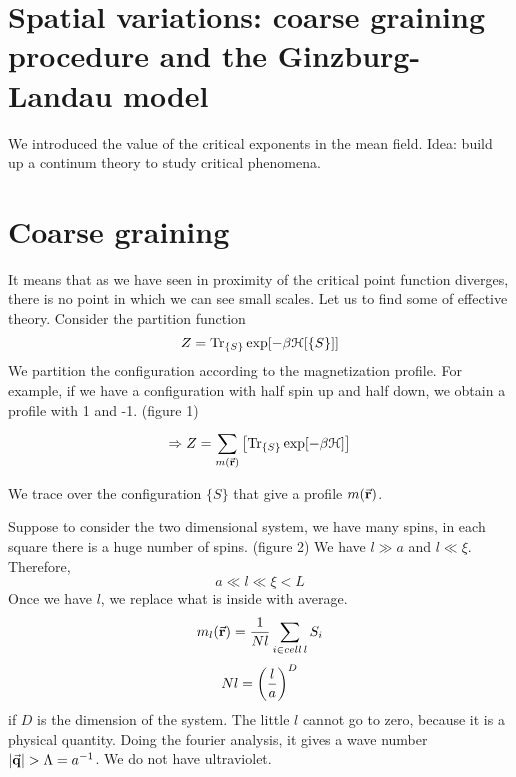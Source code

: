 \documentclass[../main/main.tex]{subfiles}
\begin{document}

\section{Spatial variations: coarse graining procedure and the Ginzburg-Landau model}



We introduced the value of the critical exponents in the mean field.
Idea: build up a continum theory to study critical phenomena.
\section{Coarse graining}
It means  that as we have seen in proximity of the critical point function diverges, there is no point in which we can see small scales. Let us to find some of effective theory.
Consider the partition function
\begin{equation}
  Z = \Tr_{\{ S \}  } \exp [- \beta \mathcal{H} [ \{ S \}  ]]
\end{equation}
We partition the configuration according to the magnetization profile. For example, if we have a configuration with half spin up and half down, we obtain a profile with 1 and -1. (figure 1)
\begin{equation}
\Rightarrow Z = \sum_{m(\va{r})}^{}  \qty[\Tr_{\{ S \}  }  \exp [- \beta \mathcal{H} ]  ]
\end{equation}
\begin{remark}
We trace over the configuration \( \{ S \}   \)  that give a profile \( m(\va{r}) \).
\end{remark}
Suppose to consider the two dimensional system, we have many spins, in each square there is a huge number of spins. (figure 2) We have \( l \gg a \) and \( l \ll \xi  \). Therefore,
\begin{equation}
  a \ll l \ll \xi < L
\end{equation}
Once we have \( l \), we replace what is inside with average.
\begin{equation}
   m_l (\va{r}) = \frac{1}{Nl} \sum_{i \in cell \, l}^{} S_i
\end{equation}
\begin{equation}
  Nl = \qty(\frac{l}{a})^D
\end{equation}
if \( D \) is the dimension of the system.
The little \( l \) cannot go to zero, because it is a physical quantity. Doing the fourier analysis, it gives a wave number \( \abs{\va{q}} > \Lambda = a^{-1} \). We do not have ultraviolet.
\end{document}
